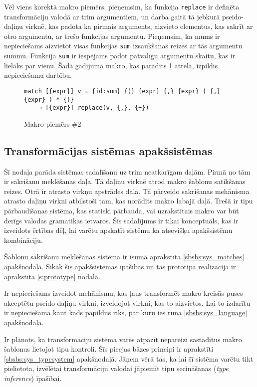 Vēl viens korektā makro piemērs: pieņemsim, ka funkcija \verb|replace| ir definēta transformāciju valodā ar trim argumentiem, un darba gaitā tā jebkurā pseido-daļiņu virknē, kas padota ka pirmais arguments, aizvieto elementus, kas sakrīt ar otro argumentu, ar trešo funkcijas argumentu. Pieņemsim, ka mums ir nepieciešams aizvietot visas funkcijas \verb|sum| izsaukšanas reizes ar tās argumentu summu. Funkcija \verb|sum| ir iespējams padot patvaļīgu argumentu skaitu, kas ir lielāks par vienu. Šādā gadījumā makro, kas parādīts \ref{fig:matchsample2} attēlā, izpildīs nepieciešamu darbību.

\begin{figure}[h!]
\begin{verbatim}
match [{expr}] v = {id:sum} {(} {expr} {,} {expr} ( {,} {expr} ) * {)}
    → [{expr}] replace(v, {,}, {+})
\end{verbatim}
\caption{\label{fig:matchsample2}Makro piemērs \#2}
\end{figure}

\subsection{\label{sbs:sys_qualities}Transformācijas sistēmas apakšsistēmas}

Šī nodaļa parāda sistēmas sadalīšanu uz trim neatkarīgam daļām. Pirmā no tām ir sakrišanu meklēšanas daļa. Tā daļiņu virknē atrod makro šablonu satikšanas reizes. Otrā ir atrasto virkņu apstrādes daļa. Tā pārveido sakrišanas mehānisma atrasto daļiņu virkni atbilstoši tam, kas norādīts makro labajā daļā. Trešā ir tipu pārbaudīšanas sistēma, kas statiski pārbauda, vai uzrakstītais makro var būt derīgs valodas gramatikas ietvaros. Šīs sadalījums ir tikai konceptuāls, kas ir izveidots ērtības dēļ, lai varētu apskatīt sistēmu ka atsevišķu apakšsistēmu kombināciju.

Šablonu sakrišanu meklēšanas sistēma ir īsumā aprakstīta \ref{sbsbs:sys_matches} apakšnodaļā. Sīkāk šīs apakšsistēmas īpašības un tās prototipa realizācija ir aprakstīta \ref{s:prototype} nodaļā.

Ir nepieciešams izveidot mehānismu, kas ļaus transformēt makro kreisās puses akceptētu pseido-daļiņu virkni, izveidojot virkni, kas to aizvietos. Lai to izdarītu ir nepieciešama kaut kāds papildus rīks, par kuru ies runa \ref{sbsbs:sys_language} apakšnodaļā.

Ir plānots, ka transformāciju sistēma varēs atpazīt nepareizi sastādītus makro šablonus lietojot tipu kontroli. Šīs pieejas bāzes principi ir aprakstīti \ref{sbsbs:sys_typesystem} apakšnodaļā. Jāņem vērā tas, ka lai šī sistēma varētu tikt pielietota, izvēlētai transformāciju valodai jāpiemīt tipu secināšanas (\emph{type inference}) īpašībai.

